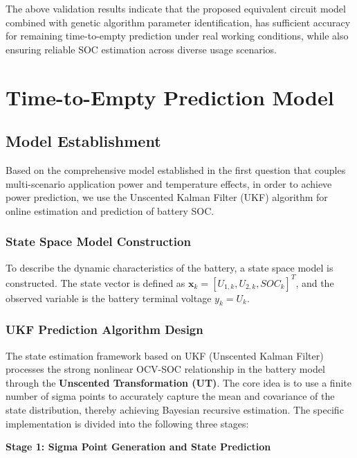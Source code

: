 \documentclass{mcmthesis}
\begin{document}
The above validation results indicate that the proposed equivalent circuit model combined with genetic algorithm parameter identification,
has sufficient accuracy for remaining time-to-empty prediction under real working conditions,
while also ensuring reliable SOC estimation across diverse usage scenarios.

\section{Time-to-Empty Prediction Model}
\subsection{Model Establishment}
Based on the comprehensive model established in the first question that couples multi-scenario application power and temperature effects, in order to achieve power prediction,
we use the Unscented Kalman Filter (UKF) algorithm for online estimation and prediction of battery SOC.
\subsubsection{State Space Model Construction}
To describe the dynamic characteristics of the battery, a state space model is constructed. The state vector is defined as $\mathbf{x}_k=[U_{1,k},U_{2,k},SOC_k]^T$, and the observed variable is the battery terminal voltage $y_k=U_k$.
\subsubsection*{UKF Prediction Algorithm Design}
The state estimation framework based on UKF (Unscented Kalman Filter) processes the strong nonlinear OCV-SOC relationship in the battery model through the \textbf{Unscented Transformation (UT)}. The core idea is to use a finite number of sigma points to accurately capture the mean and covariance of the state distribution, thereby achieving Bayesian recursive estimation. The specific implementation is divided into the following three stages:

\textbf{Stage 1: Sigma Point Generation and State Prediction}
\end{document}
